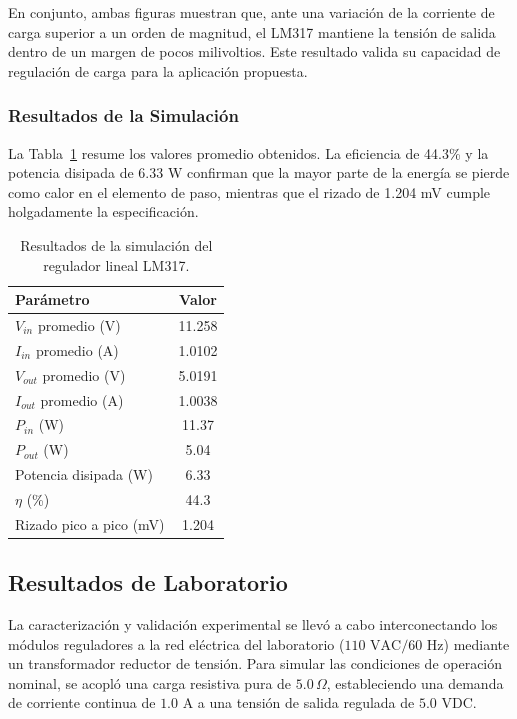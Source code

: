 \documentclass[conference]{IEEEtran}
\begin{document}
En conjunto, ambas figuras muestran que, ante una variación de la corriente de carga superior a un orden de magnitud, el LM317 mantiene la tensión de salida dentro de un margen de pocos milivoltios. Este resultado valida su capacidad de regulación de carga para la aplicación propuesta.

\smallskip
\subsubsection{\textbf{Resultados de la Simulación}}
La Tabla~\ref{tab:lin_resultados_sim} resume los valores promedio obtenidos. La eficiencia de 44.3\% y la potencia disipada de 6.33 W confirman que la mayor parte de la energía se pierde como calor en el elemento de paso, mientras que el rizado de 1.204 mV cumple holgadamente la especificación.

\begin{table}[!htb]
\caption{Resultados de la simulación del regulador lineal LM317.}
\begin{center}
\begin{tabular}{|l|c|}
\hline
\textbf{Parámetro} & \textbf{Valor} \\
\hline
$V_{in}$ promedio (V) & 11.258 \\
\hline
$I_{in}$ promedio (A) & 1.0102 \\
\hline
$V_{out}$ promedio (V) & 5.0191 \\
\hline
$I_{out}$ promedio (A) & 1.0038 \\
\hline
$P_{in}$ (W) & 11.37 \\
\hline
$P_{out}$ (W) & 5.04 \\
\hline
Potencia disipada (W) & 6.33 \\
\hline
$\eta$ (\%) & 44.3 \\
\hline
Rizado pico a pico (mV) & 1.204 \\
\hline
\end{tabular}
\label{tab:lin_resultados_sim}
\end{center}
\end{table}

\FloatBarrier
\subsection{\textbf{Resultados de Laboratorio}}
La caracterización y validación experimental se llevó a cabo interconectando los módulos reguladores a la red eléctrica del laboratorio ($110\text{ VAC} / 60\text{ Hz}$) mediante un transformador reductor de tensión. Para simular las condiciones de operación nominal, se acopló una carga resistiva pura de $5.0\,\Omega$, estableciendo una demanda de corriente continua de $1.0\text{ A}$ a una tensión de salida regulada de $5.0\text{ VDC}$.
\end{document}
